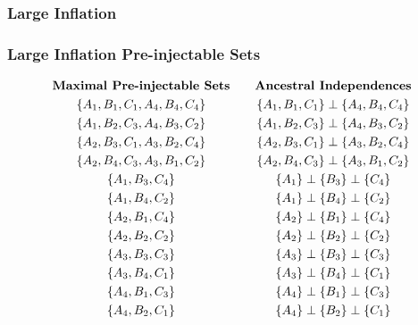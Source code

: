 \documentclass[
    hyperref={bookmarks=false},%
    xcolor={dvipsnames},
]{beamer}
\begin{document}
\begin{frame}
    \frametitle{Large Inflation}
    \begin{center}
        \scalebox{1.0}{}
    \end{center}
\end{frame}

\begin{frame}
    \frametitle{Large Inflation Pre-injectable Sets}
    \begin{equation*}
        \begin{gathered}
            \textbf{Maximal Pre-injectable Sets} \\
            \bc{A_1, B_1, C_1, A_4, B_4, C_4} \\
            \bc{A_1, B_2, C_3, A_4, B_3, C_2} \\
            \bc{A_2, B_3, C_1, A_3, B_2, C_4} \\
            \bc{A_2, B_4, C_3, A_3, B_1, C_2} \\
            \bc{A_1, B_3, C_4} \\
            \bc{A_1, B_4, C_2} \\
            \bc{A_2, B_1, C_4} \\
            \bc{A_2, B_2, C_2} \\
            \bc{A_3, B_3, C_3} \\
            \bc{A_3, B_4, C_1} \\
            \bc{A_4, B_1, C_3} \\
            \bc{A_4, B_2, C_1}
        \end{gathered}
        \qquad
        \begin{gathered}
            \textbf{Ancestral Independences} \\
            \bc{A_1, B_1, C_1} \ancestralindep \bc{A_4, B_4, C_4} \\
            \bc{A_1, B_2, C_3} \ancestralindep \bc{A_4, B_3, C_2} \\
            \bc{A_2, B_3, C_1} \ancestralindep \bc{A_3, B_2, C_4} \\
            \bc{A_2, B_4, C_3} \ancestralindep \bc{A_3, B_1, C_2} \\
            \bc{A_1} \ancestralindep \bc{B_3} \ancestralindep \bc{C_4} \\
            \bc{A_1} \ancestralindep \bc{B_4} \ancestralindep \bc{C_2} \\
            \bc{A_2} \ancestralindep \bc{B_1} \ancestralindep \bc{C_4} \\
            \bc{A_2} \ancestralindep \bc{B_2} \ancestralindep \bc{C_2} \\
            \bc{A_3} \ancestralindep \bc{B_3} \ancestralindep \bc{C_3} \\
            \bc{A_3} \ancestralindep \bc{B_4} \ancestralindep \bc{C_1} \\
            \bc{A_4} \ancestralindep \bc{B_1} \ancestralindep \bc{C_3} \\
            \bc{A_4} \ancestralindep \bc{B_2} \ancestralindep \bc{C_1}
        \end{gathered}
    \end{equation*}
\end{frame}
\end{document}
